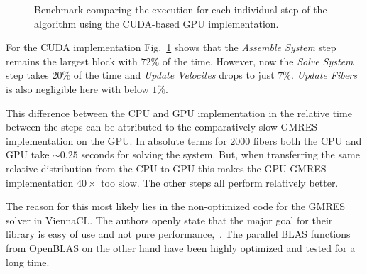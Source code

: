 \begin{figure}[!htbp]
  \centering
  \caption[Benchmark individual steps on GPU.]{Benchmark comparing the execution for each individual step of the algorithm using the CUDA-based GPU implementation.}
  \label{fig:bench_cuda_steps}
\end{figure}

For the CUDA implementation Fig.~\ref{fig:bench_cuda_steps} shows that the \emph{Assemble System} step remains the largest block with $72\%$ of the time. However, now the \emph{Solve System} step takes $20\%$ of the time and \emph{Update Velocites} drops to just $7\%$. \emph{Update Fibers} is also negligible here with below $1\%$.

This difference between the CPU and GPU implementation in the relative time between the steps can be attributed to the comparatively slow GMRES implementation on the GPU. In absolute terms for $2000$ fibers both the CPU and GPU take ${\sim}0.25$ seconds for solving the system. But, when transferring the same relative distribution from the CPU to GPU this makes the GPU GMRES implementation $40×$ too slow. The other steps all perform relatively better.

The reason for this most likely lies in the non-optimized code for the GMRES solver in ViennaCL. The authors openly state that the major goal for their library is easy of use and not pure performance,~\cite{ViennaCLRupp2010}. The parallel BLAS functions from OpenBLAS on the other hand have been highly optimized and tested for a long time.

